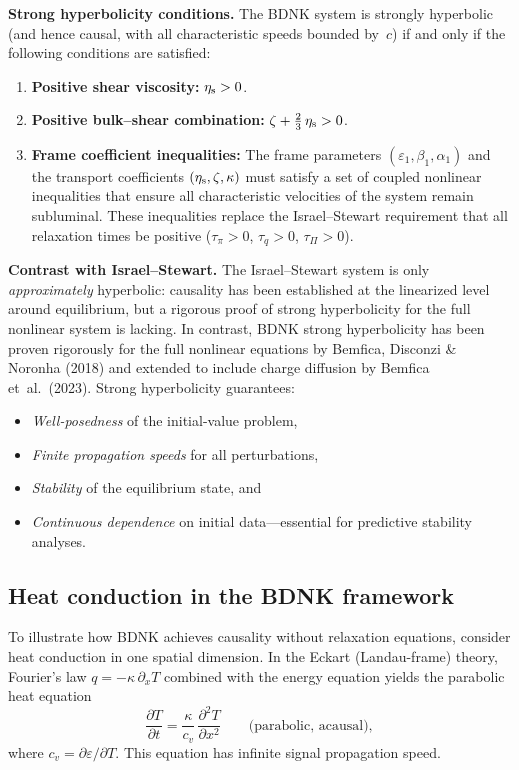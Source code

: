 \medskip\noindent
\textbf{Strong hyperbolicity conditions.}
The BDNK system is strongly hyperbolic (and hence causal, with all
characteristic speeds bounded by~$c$) if and only if the following
conditions are satisfied:
\begin{enumerate}
\item \textbf{Positive shear viscosity:} $\eta_{\mathrm{s}} > 0$.
\item \textbf{Positive bulk--shear combination:}
  $\zeta + \tfrac{2}{3}\,\eta_{\mathrm{s}} > 0$.
\item \textbf{Frame coefficient inequalities:}
  The frame parameters $(\varepsilon_1, \beta_1, \alpha_1)$ and
  the transport coefficients $(\eta_{\mathrm{s}}, \zeta, \kappa)$
  must satisfy a set of coupled nonlinear inequalities that
  ensure all characteristic velocities of the system remain
  subluminal.  These inequalities replace the Israel--Stewart
  requirement that all relaxation times be positive
  ($\tau_{\pi} > 0$, $\tau_{q} > 0$, $\tau_{\Pi} > 0$).
\end{enumerate}

\medskip\noindent
\textbf{Contrast with Israel--Stewart.}
The Israel--Stewart system is only \emph{approximately} hyperbolic:
causality has been established at the linearized level around
equilibrium, but a rigorous proof of strong hyperbolicity for the
full nonlinear system is lacking.  In contrast, BDNK strong
hyperbolicity has been proven rigorously for the full nonlinear
equations by Bemfica, Disconzi \& Noronha (2018) and extended to
include charge diffusion by Bemfica et~al.\ (2023).  Strong
hyperbolicity guarantees:
\begin{itemize}
\item \emph{Well-posedness} of the initial-value problem,
\item \emph{Finite propagation speeds} for all perturbations,
\item \emph{Stability} of the equilibrium state, and
\item \emph{Continuous dependence} on initial data---essential for
  predictive stability analyses.
\end{itemize}

\subsection{Heat conduction in the BDNK framework}
\label{sec:bdnk-heat-conduction}

To illustrate how BDNK achieves causality without relaxation
equations, consider heat conduction in one spatial dimension.  In the
Eckart (Landau-frame) theory, Fourier's law $q = -\kappa\,\partial_x T$
combined with the energy equation yields the parabolic heat equation
\begin{equation}
  \frac{\partial T}{\partial t}
    = \frac{\kappa}{c_v}\,\frac{\partial^2 T}{\partial x^2}
  \qquad\text{(parabolic, acausal)},
  \label{eq:heat-parabolic}
\end{equation}
where $c_v = \partial\varepsilon/\partial T$.  This equation has
infinite signal propagation speed.

